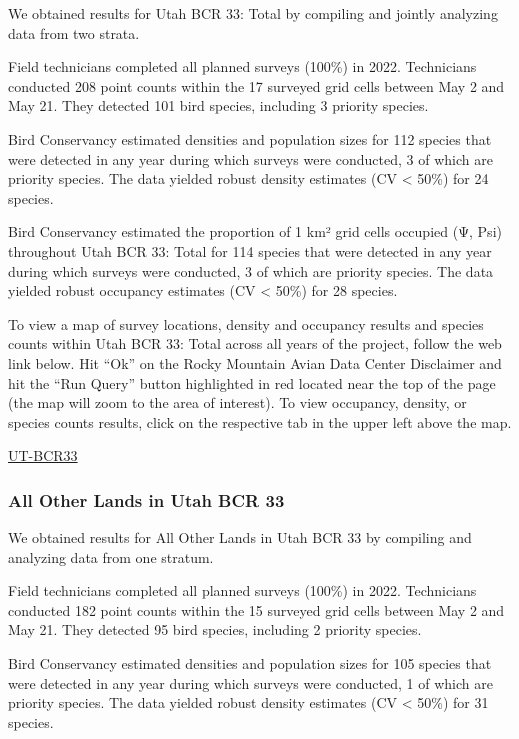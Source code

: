 \documentclass[
  letterpaper,
  DIV=11,
  numbers=noendperiod,
  oneside]{scrreprt}
\begin{document}
We obtained results for Utah BCR 33: Total by compiling and jointly
analyzing data from two strata.

Field technicians completed all planned surveys (100\%) in 2022.
Technicians conducted 208 point counts within the 17 surveyed grid cells
between May 2 and May 21. They detected 101 bird species, including 3
priority species.

Bird Conservancy estimated densities and population sizes for 112
species that were detected in any year during which surveys were
conducted, 3 of which are priority species. The data yielded robust
density estimates (CV \textless{} 50\%) for 24 species.

Bird Conservancy estimated the proportion of 1 km² grid cells occupied
(Ψ, Psi) throughout Utah BCR 33: Total for 114 species that were
detected in any year during which surveys were conducted, 3 of which are
priority species. The data yielded robust occupancy estimates (CV
\textless{} 50\%) for 28 species.

To view a map of survey locations, density and occupancy results and
species counts within Utah BCR 33: Total across all years of the
project, follow the web link below. Hit ``Ok'' on the Rocky Mountain
Avian Data Center Disclaimer and hit the ``Run Query'' button
highlighted in red located near the top of the page (the map will zoom
to the area of interest). To view occupancy, density, or species counts
results, click on the respective tab in the upper left above the map.

\href{http://www.rmbo.org/new_site/adc/QueryWindow.aspx\#N4IgzgrgDgpgTmALnAhoiBbEAuABCAVQBUBaAIQGEAlAZhpAF8g=}{UT-BCR33}

\hypertarget{all-other-lands-in-utah-bcr-33}{%
\subsubsection{All Other Lands in Utah BCR
33}\label{all-other-lands-in-utah-bcr-33}}

We obtained results for All Other Lands in Utah BCR 33 by compiling and
analyzing data from one stratum.

Field technicians completed all planned surveys (100\%) in 2022.
Technicians conducted 182 point counts within the 15 surveyed grid cells
between May 2 and May 21. They detected 95 bird species, including 2
priority species.

Bird Conservancy estimated densities and population sizes for 105
species that were detected in any year during which surveys were
conducted, 1 of which are priority species. The data yielded robust
density estimates (CV \textless{} 50\%) for 31 species.
\end{document}
